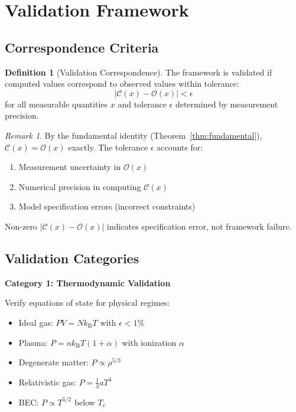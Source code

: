 \documentclass[10pt,twocolumn]{article}
\theoremstyle{plain}
\theoremstyle{definition}
\newtheorem{definition}[theorem]{Definition}
\theoremstyle{remark}
\newtheorem{remark}[theorem]{Remark}
\newcommand{\kB}{k_{\mathrm{B}}}
\newcommand{\Obs}{\mathcal{O}}
\newcommand{\Comp}{\mathcal{C}}
\begin{document}
\section{Validation Framework}
\label{sec:validation}

\subsection{Correspondence Criteria}

\begin{definition}[Validation Correspondence]
\label{def:correspondence}
The framework is validated if computed values correspond to observed values within tolerance:
\begin{equation}
|\Comp(x) - \Obs(x)| < \epsilon
\label{eq:correspondence}
\end{equation}
for all measurable quantities $x$ and tolerance $\epsilon$ determined by measurement precision.
\end{definition}

\begin{remark}
By the fundamental identity (Theorem~\ref{thm:fundamental}), $\Comp(x) = \Obs(x)$ exactly. The tolerance $\epsilon$ accounts for:
\begin{enumerate}[label=(\roman*)]
\item Measurement uncertainty in $\Obs(x)$
\item Numerical precision in computing $\Comp(x)$
\item Model specification errors (incorrect constraints)
\end{enumerate}
Non-zero $|\Comp(x) - \Obs(x)|$ indicates specification error, not framework failure.
\end{remark}

\subsection{Validation Categories}

\textbf{Category 1: Thermodynamic Validation}

Verify equations of state for physical regimes:
\begin{itemize}
\item Ideal gas: $PV = N\kB T$ with $\epsilon < 1\%$
\item Plasma: $P = n\kB T(1 + \alpha)$ with ionization $\alpha$
\item Degenerate matter: $P \propto \rho^{5/3}$
\item Relativistic gas: $P = \frac{1}{3}aT^4$
\item BEC: $P \propto T^{5/2}$ below $T_c$
\end{itemize}
\end{document}
